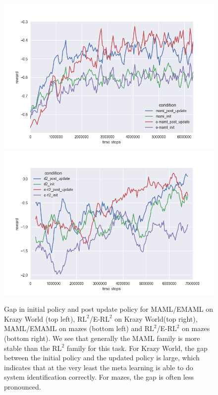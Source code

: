 \documentclass{article} %
\begin{document}
\begin{figure}[H]
\begin{center}
\includegraphics[scale=0.335]{bradly_curves/e-maml-gap-mazes.png}%
\includegraphics[scale=0.335]{bradly_curves/mazes_gap.png}  
\end{center}
\caption{Gap in initial policy and post update policy for MAML/EMAML on Krazy World (top left), $\text{RL}^2$/E-$\text{RL}^2$ on Krazy World(top right), MAML/EMAML on mazes (bottom left) and $\text{RL}^2$/E-$\text{RL}^2$ on mazes (bottom right). We see that generally the MAML family is more stable than the $\text{RL}^2$ family for this task. For Krazy World, the gap between the initial policy and the updated policy is large, which indicates that at the very least the meta learning is able to do system identification correctly. For mazes, the gap is often less pronounced.}
\end{figure} 
\end{document}
